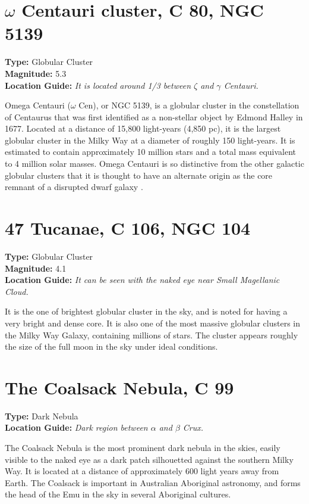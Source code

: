 \section{\texorpdfstring{$\omega$}{omega} Centauri cluster, C 80, NGC 5139}
\textbf{Type:} Globular Cluster \\
\textbf{Magnitude:} 5.3 \\ 
\textbf{Location Guide:} \textit{It is located around 1/3 between $\zeta$ and $\gamma$ Centauri.}

Omega Centauri ($\omega$ Cen), or NGC 5139, is a globular cluster in
the constellation of Centaurus that was first identified as a
non-stellar object by Edmond Halley in 1677. Located at a distance of
15,800 light-years (4,850 pc), it is the largest globular cluster in
the Milky Way at a diameter of roughly 150 light-years. It is
estimated to contain approximately 10 million stars and a total mass
equivalent to 4 million solar masses. Omega Centauri is so distinctive
from the other galactic globular clusters that it is thought to have
an alternate origin as the core remnant of a disrupted dwarf galaxy
\cite{2008ApJ...676.1008N}.

\section{47 Tucanae, C 106, NGC 104}
\textbf{Type:} Globular Cluster \\
\textbf{Magnitude:} 4.1 \\ 
\textbf{Location Guide:} \textit{It can be seen with the naked eye near Small Magellanic Cloud.}

It is the one of brightest globular cluster in the sky, and is noted
for having a very bright and dense core. It is also one of the most
massive globular clusters in the Milky Way Galaxy, containing millions of
stars. The cluster appears roughly the size of the full moon in the
sky under ideal conditions.

\section{The Coalsack Nebula, C 99}
\textbf{Type:} Dark Nebula \\
\textbf{Location Guide:} \textit{Dark region between $\alpha$ and $\beta$ Crux.}

The Coalsack Nebula is the most prominent dark nebula in the skies,
easily visible to the naked eye as a dark patch silhouetted against
the southern Milky Way. It is located at a distance of approximately
600 light years away from Earth. The Coalsack is important in
Australian Aboriginal astronomy, and forms the head of the Emu in the
sky in several Aboriginal cultures.

